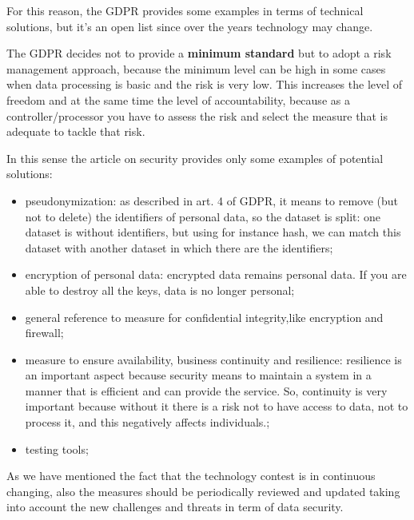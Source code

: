 For this reason, the GDPR provides some examples in terms of technical solutions, but it's an open list since over the years technology may change.

The GDPR decides not to provide a \textbf{minimum standard} but to adopt a risk management approach, because the minimum level can be high in some cases when data processing is basic and the risk is very low. This increases the level of freedom and at the same time the level of accountability, because as a controller/processor you have to assess the risk and select the measure that is adequate to tackle that risk.

In this sense the article on security provides only some examples of potential solutions:
\begin{itemize}
    \item pseudonymization: as described in art. 4 of GDPR, it means to remove (but not to delete) the identifiers of personal data, so  the dataset is split: one dataset is without identifiers, but using for instance hash, we can match this dataset with another dataset in which there are the identifiers;
    \item encryption of personal data: encrypted data remains personal data. If you are able to destroy all the keys, data is no longer personal;
    \item general reference to measure for confidential integrity,like encryption and firewall;
    \item measure to ensure availability, business continuity and resilience: resilience is an important aspect because security means to maintain a system in a manner that is efficient and can provide the service. So, continuity is very important because without it there is a risk not to have access to data, not to process it, and this negatively affects individuals.;
    \item testing tools;
\end{itemize}
As we have mentioned the fact that the technology contest is in continuous changing, also the measures should be periodically reviewed and updated taking into account the new challenges and threats in term of data security.

